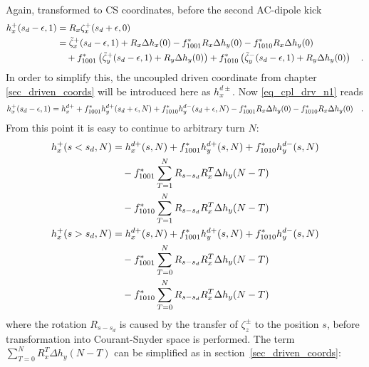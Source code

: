 %
Again, transformed to CS coordinates, before the second AC-dipole kick
%
\begin{align}
    h_x^+(s_d-\epsilon, 1) &=R_x\zeta_x^+(s_d+\epsilon, 0) \notag \\
        &=
        \tilde{\zeta}_x^+(s_d-\epsilon, 1) + R_x\Delta h_x(0)
            - f_{1001}^* R_x\Delta h_y(0)
            - f_{1010}^* R_x\Delta h_y(0)
        \notag \\ &\quad 
            + f_{1001}^* \left(\tilde{\zeta}_y^+(s_d-\epsilon, 1) + R_y\Delta h_y(0) \right)
            + f_{1010}^* \left(\tilde{\zeta}_y^-(s_d-\epsilon, 1) + R_y\Delta h_y(0) \right)
    \quad .
    \label{eq_cpl_drv_n1}
\end{align}
%
In order to simplify this, the uncoupled driven coordinate from chapter \ref{sec_driven_coords} will
be introduced here as $h_x^{d\pm}$.
Now \eqref{eq_cpl_drv_n1} reads
%
\begin{equation}
    h_x^+(s_d-\epsilon, 1)
        = h_x^{d+} + f_{1001}^* h_y^{d+}(s_d+\epsilon, N) + f_{1010}^* h_y^{d-}(s_d+\epsilon, N) 
            - f_{1001}^* R_x\Delta h_y(0)
            - f_{1010}^* R_x\Delta h_y(0)
    \quad .
\end{equation}
%
From this point it is easy to continue to arbitrary turn $N$:
%
\begin{align}
    h_x^+(s<s_d, N) &= h_x^{d+}(s,N)
        + f_{1001}^* h_y^{d+} (s, N)
        + f_{1010}^* h_y^{d-} (s, N) \notag \\
        & \quad - f_{1001}^* \sum\limits_{T = 1}^N R_{s-s_d}R_x^{T}\Delta h_y(N-T) \notag \\
        & \quad - f_{1010}^* \sum\limits_{T = 1}^N R_{s-s_d}R_x^{T}\Delta h_y(N-T)
        \notag \\
    h_x^+(s>s_d, N) &= h_x^{d+}(s,N)
        + f_{1001}^* h_y^{d+} (s, N)
        + f_{1010}^* h_y^{d-} (s, N) \notag \\
        & \quad - f_{1001}^* \sum\limits_{T = 0}^N R_{s-s_d}R_x^{T}\Delta h_y(N-T) \notag \\
        & \quad - f_{1010}^* \sum\limits_{T = 0}^N R_{s-s_d}R_x^{T}\Delta h_y(N-T)
\end{align}
%
where the rotation $R_{s-s_d}$ is caused by the transfer of $\zeta_z^\pm$ to the position $s$,
before transformation into Courant-Snyder space is performed. 
The term $\sum\limits_{T = 0}^N R_x^{T}\Delta h_y(N-T) $ can be simplified as in section~\ref{sec_driven_coords}:
%
